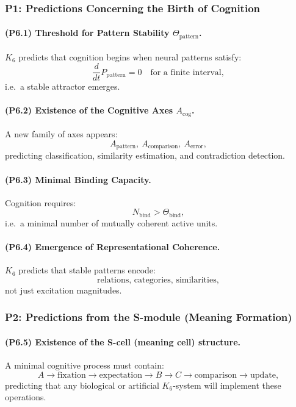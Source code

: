 \subsubsection{P1: Predictions Concerning the Birth of Cognition}

\paragraph{(P6.1) Threshold for Pattern Stability $\Theta_{\mathrm{pattern}}$.}
$K_6$ predicts that cognition begins when neural patterns satisfy:
\[
\frac{d}{dt} P_{\mathrm{pattern}} = 0
\quad \text{for a finite interval},
\]
i.e.\ a stable attractor emerges.

\paragraph{(P6.2) Existence of the Cognitive Axes $A_{\mathrm{cog}}$.}
A new family of axes appears:
\[
A_{\mathrm{pattern}}, \ A_{\mathrm{comparison}}, \ A_{\mathrm{error}},
\]
predicting classification, similarity estimation, and contradiction detection.

\paragraph{(P6.3) Minimal Binding Capacity.}
Cognition requires:
\[
N_{\mathrm{bind}} > \Theta_{\mathrm{bind}},
\]
i.e.\ a minimal number of mutually coherent active units.

\paragraph{(P6.4) Emergence of Representational Coherence.}
$K_6$ predicts that stable patterns encode:
\[
\text{relations, categories, similarities},
\]
not just excitation magnitudes.

\subsubsection{P2: Predictions from the S-module (Meaning Formation)}

\paragraph{(P6.5) Existence of the S-cell (meaning cell) structure.}
A minimal cognitive process must contain:
\[
A \to \text{fixation} \to \text{expectation} \to B \to C \to \text{comparison} \to \text{update},
\]
predicting that any biological or artificial $K_6$-system will implement these
operations.

